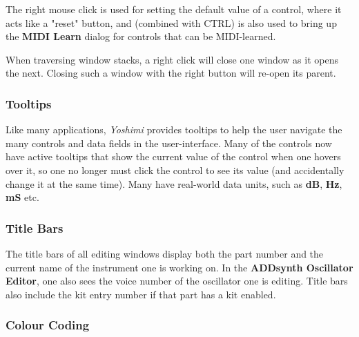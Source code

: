 
    The right mouse click is used for setting the default value of a control,
    where it acts like a "reset" button, and (combined with CTRL) is also
    used to bring up the \textbf{MIDI Learn} dialog for controls that can be
    MIDI-learned.

   When traversing window stacks, a right click will close one window as it
   opens the next. Closing such a window with the right button will re-open its
   parent.

\subsubsection{Tooltips}
\label{subsubsec:stock_settings_tooltips}

   Like many applications, \textsl{Yoshimi} provides tooltips to help the user
   navigate the many controls and data fields in the user-interface.  Many of
   the controls now have active tooltips that show the current value of the
   control when one hovers over it, so one no longer must click the control to
   see its value (and accidentally change it at the same time). Many have
   real-world data units, such as \textbf{dB}, \textbf{Hz}, \textbf{mS} etc.

\subsubsection{Title Bars}
\label{subsubsec:stock_settings_elements_title_bars}

   The title bars of all editing windows display both the part number and the
   current name of the instrument one is working on.  In the
   \textbf{ADDsynth Oscillator Editor}, one also sees the
   voice number of the oscillator one is editing.
   Title bars also include the kit entry number if that part has a kit enabled.

\subsubsection{Colour Coding}
\label{subsubsec:stock_settings_elements_color_coding}

